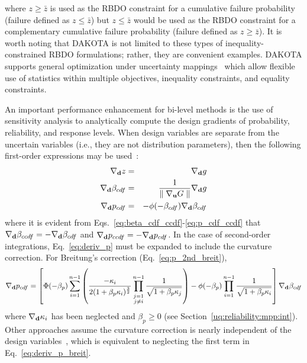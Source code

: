 \noindent where $z \ge \bar{z}$ is used as the RBDO constraint for 
a cumulative failure probability (failure defined as $z \le \bar{z}$)
but $z \le \bar{z}$ would be used as the RBDO constraint for a
complementary cumulative failure probability (failure defined as $z
\ge \bar{z}$).  It is worth noting that DAKOTA is not limited to these
types of inequality-constrained RBDO formulations; rather, they are
convenient examples.  DAKOTA supports general optimization under
uncertainty mappings~\cite{Eld02} which allow flexible use of
statistics within multiple objectives, inequality constraints, and
equality constraints.

An important performance enhancement for bi-level methods is the use
of sensitivity analysis to analytically compute the design gradients
of probability, reliability, and response levels.  When design
variables are separate from the uncertain variables (i.e., they are
not distribution parameters), then the following first-order 
expressions may be used~\cite{Hoh86,Kar92,All04}:
\begin{eqnarray}
\nabla_{\bf d} z           & = & \nabla_{\bf d} g \label{eq:deriv_z} \\
\nabla_{\bf d} \beta_{cdf} & = & \frac{1}{{\parallel \nabla_{\bf u} G 
\parallel}} \nabla_{\bf d} g \label{eq:deriv_beta} \\
\nabla_{\bf d} p_{cdf}     & = & -\phi(-\beta_{cdf}) \nabla_{\bf d} \beta_{cdf}
\label{eq:deriv_p}
\end{eqnarray}
where it is evident from Eqs.~\ref{eq:beta_cdf_ccdf}-\ref{eq:p_cdf_ccdf} 
that $\nabla_{\bf d} \beta_{ccdf} = -\nabla_{\bf d} \beta_{cdf}$ and 
$\nabla_{\bf d} p_{ccdf} = -\nabla_{\bf d} p_{cdf}$.  In the case of 
second-order integrations, Eq.~\ref{eq:deriv_p} must be expanded to 
include the curvature correction.  For Breitung's correction 
(Eq.~\ref{eq:p_2nd_breit}),
\begin{equation}
\nabla_{\bf d} p_{cdf} = \left[ \Phi(-\beta_p) \sum_{i=1}^{n-1} 
\left( \frac{-\kappa_i}{2 (1 + \beta_p \kappa_i)^{\frac{3}{2}}}
\prod_{\stackrel{\scriptstyle j=1}{j \ne i}}^{n-1} 
\frac{1}{\sqrt{1 + \beta_p \kappa_j}} \right) - 
\phi(-\beta_p) \prod_{i=1}^{n-1} \frac{1}{\sqrt{1 + \beta_p \kappa_i}} 
\right] \nabla_{\bf d} \beta_{cdf} \label{eq:deriv_p_breit}
\end{equation}
where $\nabla_{\bf d} \kappa_i$ has been neglected and $\beta_p \ge 0$
(see Section~\ref{uq:reliability:mpp:int}).  Other approaches assume
the curvature correction is nearly independent of the design
variables~\cite{Rac02}, which is equivalent to neglecting the first
term in Eq.~\ref{eq:deriv_p_breit}.

